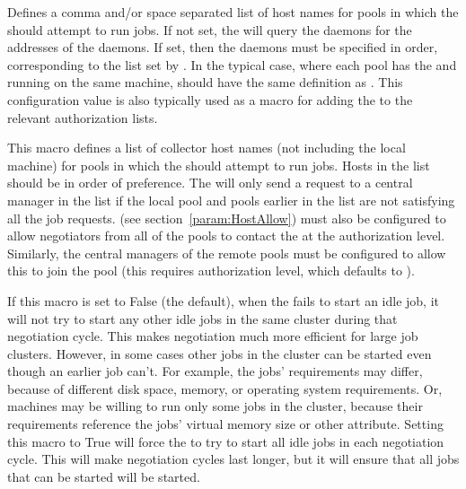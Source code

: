 \begin{description}
\label{param:FlockNegotiatorHosts} 
\item[\Macro{FLOCK\_NEGOTIATOR\_HOSTS}]
  Defines a comma and/or space separated list of  host
  names for pools in which the  should attempt to run jobs.
  If not set,
  the  will query the  daemons for 
  the addresses of the  daemons.
  If set, then the  daemons must be specified in order,
  corresponding to the list set by .
  In the typical case, where each pool
  has the  and  running on the 
  same machine,
   should have the same definition as
  .  This configuration value is also
  typically used as a macro for adding the  to the relevant
  authorization lists.

\label{param:FlockCollectorHosts}
\item[\Macro{FLOCK\_COLLECTOR\_HOSTS}]
  This macro defines a list of collector host names (not including the
  local  machine) for pools in which the
   should attempt to run jobs.  Hosts in the list
  should be in order of preference.  The  will only
  send a request to a central manager in the list if the local pool
  and pools earlier in the list are not satisfying all the job
  requests.   (see
  section~\ref{param:HostAllow}) must also be configured to allow
  negotiators from all of the pools to contact the  at
  the  authorization level.  Similarly, the central
  managers of the remote pools must be configured to allow this
   to join the pool (this requires 
  authorization level, which defaults to ).

  \label{param:NegotiateAllJobsInCluster}
\item[\Macro{NEGOTIATE\_ALL\_JOBS\_IN\_CLUSTER}]
  If this macro is set to False (the default), when the  fails
  to start an idle job, it will not try to start any other
  idle jobs in the same cluster during that negotiation cycle.  This
  makes negotiation much more efficient for large job clusters.
  However, in some cases other jobs in the cluster can be started even
  though an earlier job can't.  For example, the jobs' requirements
  may differ, because of different disk space, memory, or
  operating system requirements.  Or, machines may be willing to run
  only some jobs in the cluster, because their requirements reference
  the jobs' virtual memory size or other attribute.  Setting this
  macro to True will force the  to try to start all idle jobs in
  each negotiation cycle.  This will make negotiation cycles last
  longer, but it will ensure that all jobs that can be started will be
  started.


\end{description}
